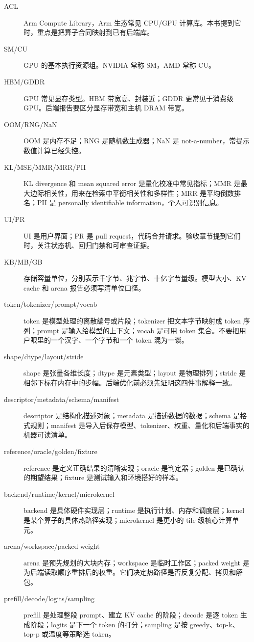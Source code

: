 \begin{description}
  \item[ACL] Arm Compute Library，Arm 生态常见 CPU/GPU 计算库。本书提到它时，重点是把算子合同映射到已有后端库。
  \item[SM/CU] GPU 的基本执行资源组。NVIDIA 常称 SM，AMD 常称 CU。
  \item[HBM/GDDR] GPU 常见显存类型。HBM 带宽高、封装近；GDDR 更常见于消费级 GPU。后端报告要区分显存带宽和主机 DRAM 带宽。
  \item[OOM/RNG/NaN] OOM 是内存不足；RNG 是随机数生成器；NaN 是 not-a-number，常提示数值计算已经失控。
  \item[KL/MSE/MMR/MRR/PII] KL divergence 和 mean squared error 是量化校准中常见指标；MMR 是最大边际相关性，用来在检索中平衡相关性和多样性；MRR 是平均倒数排名；PII 是 personally identifiable information，个人可识别信息。
  \item[UI/PR] UI 是用户界面；PR 是 pull request，代码合并请求。验收章节提到它们时，关注状态机、回归门禁和可审查证据。
  \item[KB/MB/GB] 存储容量单位，分别表示千字节、兆字节、十亿字节量级。模型大小、KV cache 和 arena 报告必须写清单位口径。
  \item[token/tokenizer/prompt/vocab] token 是模型处理的离散编号或片段；tokenizer 把文本字节映射成 token 序列；prompt 是输入给模型的上下文；vocab 是可用 token 集合。不要把用户眼里的一个汉字、一个字节和一个 token 混为一谈。
  \item[shape/dtype/layout/stride] shape 是张量各维长度；dtype 是元素类型；layout 是物理排列；stride 是相邻下标在内存中的步幅。后端优化前必须先证明这四件事解释一致。
  \item[descriptor/metadata/schema/manifest] descriptor 是结构化描述对象；metadata 是描述数据的数据；schema 是格式规则；manifest 是导入后保存模型、tokenizer、权重、量化和后端事实的机器可读清单。
  \item[reference/oracle/golden/fixture] reference 是定义正确结果的清晰实现；oracle 是判定器；golden 是已确认的期望结果；fixture 是测试输入和环境搭好的样本。
  \item[backend/runtime/kernel/microkernel] backend 是具体硬件实现层；runtime 是执行计划、内存和调度层；kernel 是某个算子的具体热路径实现；microkernel 是更小的 tile 级核心计算单元。
  \item[arena/workspace/packed weight] arena 是预先规划的大块内存；workspace 是临时工作区；packed weight 是为后端读取顺序重排后的权重。它们决定热路径是否反复分配、拷贝和解包。
  \item[prefill/decode/logits/sampling] prefill 是处理整段 prompt、建立 KV cache 的阶段；decode 是逐 token 生成阶段；logits 是下一个 token 的打分；sampling 是按 greedy、top-k、top-p 或温度等策略选 token。

\end{description}
